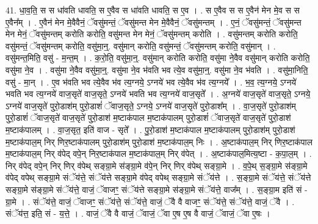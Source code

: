 \documentclass[17pt]{extarticle}
\begin{document}
41. धा॒व॒ति॒ स स धा॑वति धावति॒ स ए॒वैव स धा॑वति धावति॒ स ए॒व । . स ए॒वैव स स ए॒वैन॑ मेन मे॒व स स ए॒वैन᳚म् । . ए॒वैन॑ मेन मे॒वैवैनं॒ ॅवसु॑मन्तं॒ ॅवसु॑मन्त मेन मे॒वैवैनं॒ ॅवसु॑मन्तम् । . ए॒नं॒ ॅवसु॑मन्तं॒ ॅवसु॑मन्त मेन मेनं॒ ॅवसु॑मन्तम् करोति करोति॒ वसु॑मन्त मेन मेनं॒ ॅवसु॑मन्तम् करोति । . वसु॑मन्तम् करोति करोति॒ वसु॑मन्तं॒ ॅवसु॑मन्तम् करोति॒ वसु॑मा॒न्॒. वसु॑मान् करोति॒ वसु॑मन्तं॒ ॅवसु॑मन्तम् करोति॒ वसु॑मान् । . वसु॑मन्त॒मिति॒ वसु॑ - म॒न्त॒म् । . क॒रो॒ति॒ वसु॑मा॒न्॒. वसु॑मान् करोति करोति॒ वसु॑मा ने॒वैव वसु॑मान् करोति करोति॒ वसु॑मा ने॒व । . वसु॑मा ने॒वैव वसु॑मा॒न्॒. वसु॑मा ने॒व भ॑वति भव त्ये॒व वसु॑मा॒न्॒. वसु॑मा ने॒व भ॑वति । . वसु॑मा॒निति॒॒ वसु॑ - मा॒न् । . ए॒व भ॑वति भव त्ये॒वैव भ॑व त्य॒ग्नये॒ ऽग्नये॑ भव त्ये॒वैव भ॑व त्य॒ग्नये᳚ । . भ॒व॒ त्य॒ग्नये॒ ऽग्नये॑ भवति भव त्य॒ग्नये॑ वाज॒सृते॑ वाज॒सृते॒ ऽग्नये॑ भवति भव त्य॒ग्नये॑ वाज॒सृते᳚ । . अ॒ग्नये॑ वाज॒सृते॑ वाज॒सृते॒ ऽग्नये॒ ऽग्नये॑ वाज॒सृते॑ पुरो॒डाश॑म् पुरो॒डाशं॑ ॅवाज॒सृते॒ ऽग्नये॒ ऽग्नये॑ वाज॒सृते॑ पुरो॒डाश᳚म् । . वा॒ज॒सृते॑ पुरो॒डाश॑म् पुरो॒डाशं॑ ॅवाज॒सृते॑ वाज॒सृते॑ पुरो॒डाश॑ म॒ष्टाक॑पाल म॒ष्टाक॑पालम् पुरो॒डाशं॑ ॅवाज॒सृते॑ वाज॒सृते॑ पुरो॒डाश॑ म॒ष्टाक॑पालम् । . वा॒ज॒सृत॒ इति॑ वाज - सृते᳚ । . पु॒रो॒डाश॑ म॒ष्टाक॑पाल म॒ष्टाक॑पालम् पुरो॒डाश॑म् पुरो॒डाश॑ म॒ष्टाक॑पाल॒म् निर् णिर॒ष्टाक॑पालम् पुरो॒डाश॑म् पुरो॒डाश॑ म॒ष्टाक॑पाल॒म् निः । . अ॒ष्टाक॑पाल॒म् निर् णिर॒ष्टाक॑पाल म॒ष्टाक॑पाल॒म् निर् व॑पेद् वपे॒न् निर॒ष्टाक॑पाल म॒ष्टाक॑पाल॒म् निर् व॑पेत् । . अ॒ष्टाक॑पाल॒मित्य॒ष्टा - क॒पा॒ल॒म् । . निर् व॑पेद् वपे॒न् निर् णिर् व॑पेथ् सङ्ग्रा॒मे स॑ङ्ग्रा॒मे व॑पे॒न् निर् णिर् व॑पेथ् सङ्ग्रा॒मे । . व॒पे॒थ् स॒ङ्ग्रा॒मे स॑ङ्ग्रा॒मे व॑पेद् वपेथ् सङ्ग्रा॒मे संॅय॑त्ते॒ संॅय॑त्ते सङ्ग्रा॒मे व॑पेद् वपेथ् सङ्ग्रा॒मे संॅय॑त्ते । . स॒ङ्ग्रा॒मे संॅय॑त्ते॒ संॅय॑त्ते सङ्ग्रा॒मे स॑ङ्ग्रा॒मे संॅय॑त्ते॒ वाजं॒ ॅवाजꣳ॒॒ संॅय॑त्ते सङ्ग्रा॒मे स॑ङ्ग्रा॒मे संॅय॑त्ते॒ वाज᳚म् । . स॒ङ्ग्रा॒म इति॑ सं - ग्रा॒मे । . संॅय॑त्ते॒ वाजं॒ ॅवाजꣳ॒॒ संॅय॑त्ते॒ संॅय॑त्ते॒ वाजं॒ ॅवै वै वाजꣳ॒॒ संॅय॑त्ते॒ संॅय॑त्ते॒ वाजं॒ ॅवै । . संॅय॑त्त॒ इति॒ सं - य॒त्ते॒ । . वाजं॒ ॅवै वै वाजं॒ ॅवाजं॒ ॅवा ए॒ष ए॒ष वै वाजं॒ ॅवाजं॒ ॅवा ए॒षः । \newline
\pagebreak
{}
\end{document}
